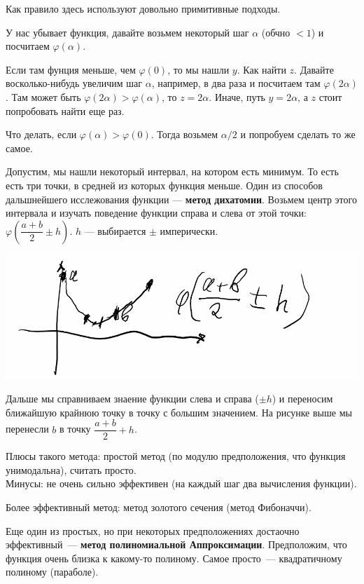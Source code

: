Как правило здесь используют довольно примитивные подходы.

У нас убывает функция, давайте возьмем некоторый шаг $\alpha$ (обчно $< 1$) и посчитаем $\varphi (\alpha)$.

Если там фунция меньше, чем $\varphi (0)$, то мы нашли $y$. Как найти $z$.
Давайте восколько-нибудь увеличим шаг $\alpha$, например, в два раза и посчитаем там $\varphi(2 \alpha)$.
Там может быть $\varphi(2 \alpha) > \varphi(\alpha)$, то $z = 2\alpha$.
Иначе, путь $y = 2\alpha$, а $z$ стоит попробовать найти еще раз.

Что делать, если $\varphi(\alpha) > \varphi(0)$.
Тогда возьмем $ \alpha / 2$ и попробуем сделать то же самое.

Допустим, мы нашли некоторый интервал, на котором есть минимум.
То есть есть три точки, в средней из которых функция меньше.
Один из способов дальшнейшего исслежования функции --- \textbf{метод дихатомии}.
Возьмем центр этого интервала и изучать поведение функции справа и слева от этой точки: $\varphi\left(\dfrac{a+b}{2} \pm h \right)$.
$h$ --- выбирается $\pm$ имперически.

\begin{center}
    \includegraphics[scale=0.5]{img/methopt_one_dimensional_optimization_f_proect_pmh_points}
\end{center}

Дальше мы справниваем знаение функции слева и справа ($\pm h$) и переносим ближайшую крайнюю точку в точку с большим значением.
На рисунке выше мы перенесли $b$ в точку $\dfrac{a+b}{2}+h$.

Плюсы такого метода: простой метод (по модулю предположения, что функция унимодальна), считать просто.\\
Минусы: не очень сильно эффективен (на каждый шаг два вычисления функции).

Более эффективный метод: метод золотого сечения (метод Фибоначчи).

Еще один из простых, но при некоторых предположениях достаочно эффективный~--- \textbf{метод полиномиальной Аппроксимации}.
Предположим, что функция очень близка к какому-то полиному.
Самое просто~--- квадратичному полиному (параболе).


